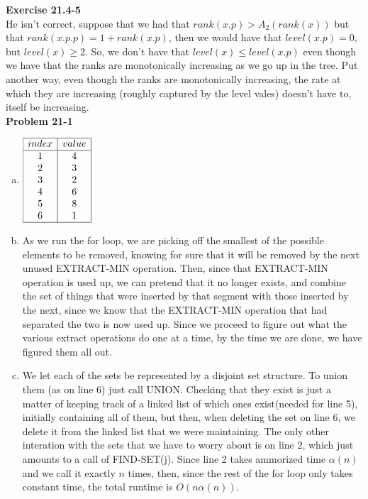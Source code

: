 \documentclass{article}
\begin{document}
\noindent\textbf{Exercise 21.4-5}\\
He isn't correct, suppose that we had that $rank(x.p) >A_{2}(rank(x))$ but that $rank(x.p.p) = 1 + rank(x.p)$, then we would have that $level(x.p) =0$, but $level(x) \ge 2$. So, we don't have that $level(x) \le level(x.p)$ even though we have that the ranks are monotonically increasing as we go up in the tree. Put another way, even though the ranks are monotonically increasing, the rate at which they are increasing (roughly captured by the level vales) doesn't have to, itself be increasing.\\ 

\noindent\textbf{Problem 21-1}\\
\begin{enumerate}[a.]
\item
$
\begin{array}{|c|c|}
\hline
index&value\\
\hline
1&4\\
2&3\\
3&2\\
4&6\\
5&8\\
6&1\\
\hline
\end{array}
$

\item
As we run the for loop, we are picking off the smallest of the possible elements to be removed, knowing for sure that it will be removed by the next unused EXTRACT-MIN operation. Then, since that EXTRACT-MIN operation is used up, we can pretend that it no longer exists, and combine the set of things that were inserted by that segment with those inserted by the next, since we know that the EXTRACT-MIN operation that had separated the two is now used up. Since we proceed to figure out what the various extract operations do one at a time, by the time we are done, we have figured them all out.

\item
We let each of the sets be represented by a disjoint set structure. To union them (as on line 6) just call UNION. Checking that they exist is just a matter of keeping track of a linked list of which ones exist(needed for line 5), initially containing all of them, but then, when deleting the set on line 6, we delete it from the linked list that we were maintaining. The only other interation with the sets that we have to worry about is on line 2, which just amounts to a call of FIND-SET(j). Since line 2 takes ammorized time $\alpha(n)$ and we call it exactly $n$ times, then, since the rest of the for loop only takes constant time, the total runtime is $O(n\alpha(n))$.

\end{enumerate}
\end{document}
